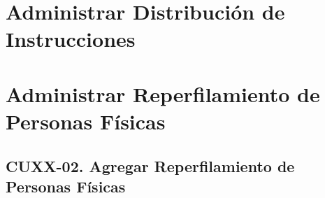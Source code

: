 	\clearpage
	\section{Administrar Distribuci\'on de Instrucciones} \label{sec:cf-uc-admin-distribucioninstrucciones}
	
	\clearpage
	\section{Administrar Reperfilamiento de Personas F\'isicas} \label{sec:cf-uc-admin-reperfilamientopersonafisica}
	
	\clearpage
	\subsection{CUXX-02. Agregar Reperfilamiento de Personas F\'isicas} \label{sec:cu-create-ReperfilamientoPersonaFisica}
	
